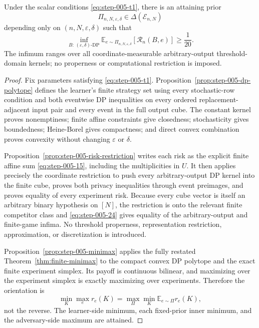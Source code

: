 \begin{proposition}
\label{prop:step-005-result}
Under the scalar conditions \eqref{eq:step-005-t1}, there is an attaining prior
\[
\Pi_{n,N,\varepsilon,\delta}\in\Delta(\mathcal E_{n,N})
\]
depending only on $(n,N,\varepsilon,\delta)$ such that
\[
\inf_{B:\,(\varepsilon,\delta)\text{-DP}}
\mathbb E_{e\sim\Pi_{n,N,\varepsilon,\delta}}
  [\mathcal R_n(B,e)]\geq\frac1{20}.
\tag{HP}\label{eq:hard-prior}
\]
The infimum ranges over all coordinate-measurable arbitrary-output
threshold-domain kernels; no properness or computational restriction is
imposed.
\end{proposition}
\begin{proof}

Fix parameters satisfying \eqref{eq:step-005-t1}. Proposition~\ref{prop:step-005-dp-polytope} defines the learner's finite strategy set using every stochastic-row condition and both eventwise DP inequalities on every ordered replacement-adjacent input pair and every event in the full output cube. The constant kernel proves nonemptiness; finite affine constraints give closedness; stochasticity gives boundedness; Heine-Borel gives compactness; and direct convex combination proves convexity without changing \(\varepsilon\) or \(\delta\).

Proposition~\ref{prop:step-005-risk-restriction} writes each risk as the explicit finite affine sum \eqref{eq:step-005-15}, including the multiplicities in \(U\). It then applies precisely the coordinate restriction to push every arbitrary-output DP kernel into the finite cube, proves both privacy inequalities through event preimages, and proves equality of every experiment risk. Because every cube vector is itself an arbitrary binary hypothesis on \([N]\), the restriction is onto the relevant finite competitor class and \eqref{eq:step-005-24} gives equality of the arbitrary-output and finite-game infima. No threshold properness, representation restriction, approximation, or discretization is introduced.

Proposition~\ref{prop:step-005-minimax} applies the fully restated Theorem~\ref{thm:finite-minimax} to the compact convex DP polytope and the exact finite experiment simplex. Its payoff is continuous bilinear, and maximizing over the experiment simplex is exactly maximizing over experiments. Therefore the orientation is
\[
\min_K\max_e r_e(K)
=
\max_\Pi\min_K\mathbb E_{e\sim\Pi}r_e(K),
\]
not the reverse. The learner-side minimum, each fixed-prior inner minimum, and the adversary-side maximum are attained.


\end{proof}

